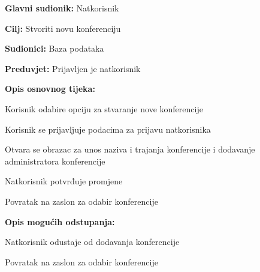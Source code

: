 					\noindent {}
					\begin{packed_item}
						
						\item \textbf{Glavni sudionik: } Natkorisnik
						\item  \textbf{Cilj:} Stvoriti novu konferenciju
						\item  \textbf{Sudionici:} Baza podataka
						\item  \textbf{Preduvjet:} Prijavljen je natkorisnik
						\item  \textbf{Opis osnovnog tijeka:}
						
						\item[] \begin{packed_enum}
							
							\item Korisnik odabire opciju za stvaranje nove konferencije
							\item Korisnik se prijavljuje podacima za prijavu natkorisnika
							\item Otvara se obrazac za unos naziva i trajanja konferencije i dodavanje administratora konferencije
							\item Natkorisnik potvrđuje promjene
							\item Povratak na zaslon za odabir konferencije
							
						\end{packed_enum}
						
						\item  \textbf{Opis mogućih odstupanja:}
						
						\item[] \begin{packed_item}
							
							\item[4.a] Natkorisnik odustaje od dodavanja konferencije
							\item[] \begin{packed_enum}
								
								\item Povratak na zaslon za odabir konferencije
								
							\end{packed_enum}
							
						\end{packed_item}
						
					\end{packed_item}
					
